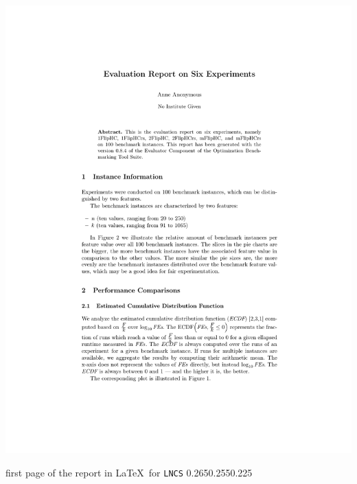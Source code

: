 \begin{frame}[t]
{{{\includegraphics[width=0.215\paperwidth,page=1]{graphics/maxsat_example/maxsat_example_reports/LNCS_report.pdf}%
}\strut\hfill\strut}%
}{%
first page of the report in \LaTeX\ for \texttt{LNCS}%
}{0.265}{0.255}{0.225}%
%
\end{frame}
